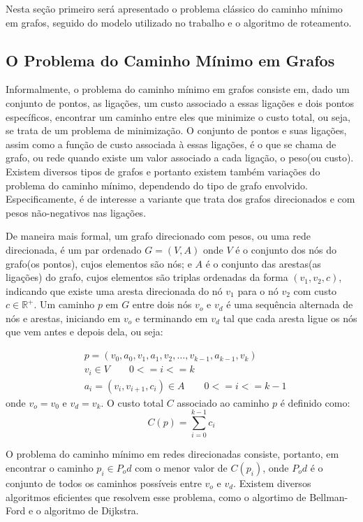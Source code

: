 Nesta seção primeiro será apresentado o problema clássico do caminho mínimo em grafos, seguido do modelo utilizado no trabalho e o algoritmo de roteamento.

\subsection{O Problema do Caminho Mínimo em Grafos}

Informalmente, o problema do caminho mínimo em grafos consiste em, dado um conjunto de pontos, as ligações, um custo associado a essas ligações e dois pontos específicos, encontrar um caminho entre eles que minimize o custo total, ou seja, se trata de um problema de minimização.
O conjunto de pontos e suas ligações, assim como a função de custo associada à essas ligações, é o que se chama de grafo, ou rede quando existe um valor associado a cada ligação, o peso(ou custo).
Existem diversos tipos de grafos e portanto existem também variações do problema do caminho mínimo, dependendo do tipo de grafo envolvido.
Especificamente, é de interesse a variante que trata dos grafos direcionados e com pesos não-negativos nas ligações.

De maneira mais formal, um grafo direcionado com pesos, ou uma rede direcionada, é um par ordenado $G = (V, A)$ onde $V$ é o conjunto dos nós do grafo(os pontos), cujos elementos são nós; e $A$ é o conjunto das arestas(as ligações) do grafo, cujos elementos são triplas ordenadas da forma $(v_1, v_2, c)$, indicando que existe uma aresta direcionada do nó $v_1$ para o nó $v_2$ com custo $c \in \mathbb{R^+}$.
Um caminho $p$ em $G$ entre dois nós $v_o$ e $v_d$ é uma sequência alternada de nós e arestas, iniciando em $v_o$ e terminando em $v_d$ tal que cada aresta ligue os nós que vem antes e depois dela, ou seja:

\begin{align*}
& p = (v_0, a_0, v_1, a_1, v_2, \ldots ,v_{k-1}, a_{k-1}, v_k) \\
& v_i \in V \qquad 0 <= i <= k \\
& a_i = (v_i, v_{i+1}, c_i) \in A \qquad 0 <= i <= k-1
\end{align*}
onde $v_o = v_0$ e $v_d = v_k$. O custo total $C$ associado ao caminho $p$ é definido como:
\begin{equation*}
C(p) = \sum_{i=0}^{k-1} c_i
\end{equation*}

O problema do caminho mínimo em redes direcionadas consiste, portanto, em encontrar o caminho $p_i \in P_od$ com o menor valor de $C(p_i)$, onde $P_od$ é o conjunto de todos os caminhos possíveis entre $v_o$ e $v_d$. Existem diversos algoritmos eficientes que resolvem esse problema, como o algortimo de Bellman-Ford e o algoritmo de Dijkstra.

